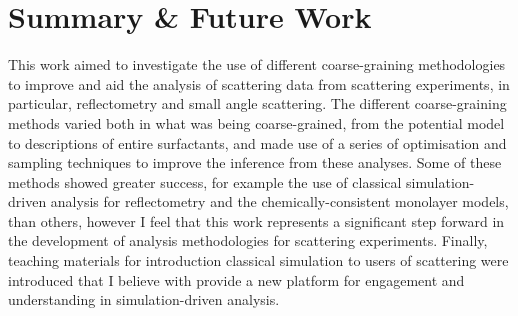 
\chapter{Summary \& Future Work} %

\label{summary} %


This work aimed to investigate the use of different coarse-graining methodologies to improve and aid the analysis of scattering data from scattering experiments, in particular, reflectometry and small angle scattering.
The different coarse-graining methods varied both in what was being coarse-grained, from the potential model to descriptions of entire surfactants, and made use of a series of optimisation and sampling techniques to improve the inference from these analyses.
Some of these methods showed greater success, for example the use of classical simulation-driven analysis for reflectometry and the chemically-consistent monolayer models, than others, however I feel that this work represents a significant step forward in the development of analysis methodologies for scattering experiments.
Finally, teaching materials for introduction classical simulation to users of scattering were introduced that I believe with provide a new platform for engagement and understanding in simulation-driven analysis.

